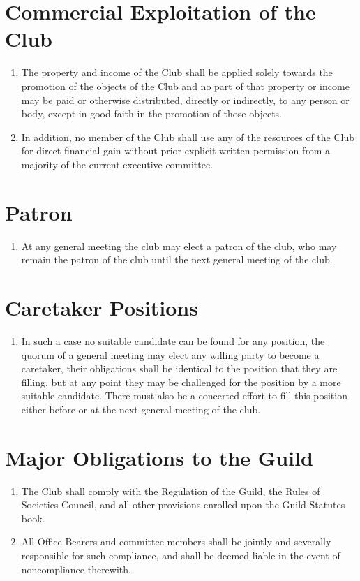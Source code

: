 \documentclass[10pt,a4paper]{report}
\begin{document}
		\section{Commercial Exploitation of the Club}
		\begin{enumerate}[label=\arabic*]
			\item The property and income of the Club shall be applied solely towards the promotion of the objects of the Club and no part of that property or income may be paid or otherwise distributed, directly or indirectly, to any person or body, except in good faith in the promotion of those objects.
			\item In addition, no member of the Club shall use any of the resources of the Club for direct financial gain without prior explicit written permission from a majority of the current executive committee.
		\end{enumerate}
		
		\section{Patron}
		    \begin{enumerate}[label=\arabic*]
			  \item At any general meeting the club may elect a patron of the club, who may remain the patron of the club until the next general meeting of the club. \\
			\end{enumerate}
		\section{Caretaker Positions}
		     \begin{enumerate}[label=\arabic*]
		       \item In such a case no suitable candidate can be found for any position, the quorum of a general meeting may elect any willing party to become a caretaker, their obligations shall be identical to the position that they are filling, but at any point they may be challenged for the position by a more suitable candidate. There must also be a concerted effort to fill this position either before or at the next general meeting of the club.
             \end{enumerate}
		\section{Major Obligations to the Guild}
			\begin{enumerate}[label=\arabic*]
				\item The Club shall comply with the Regulation of the Guild, the Rules of Societies Council, and all other provisions enrolled upon the Guild Statutes book.
				\item All Office Bearers and committee members shall be jointly and severally responsible for such compliance, and shall be deemed liable in the event of noncompliance therewith.
			\end{enumerate}
\end{document}
